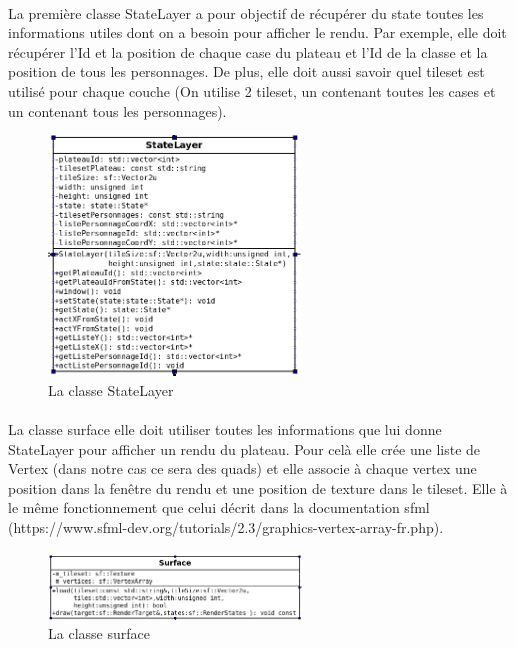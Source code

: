 \documentclass[a4paper,12pt]{article}
\begin{document}
\paragraph{}La première classe StateLayer a pour objectif de récupérer du state toutes les informations utiles dont on a besoin pour afficher le rendu. Par exemple, elle doit récupérer l'Id et la position de chaque case du plateau et l'Id de la classe et la position de tous les personnages. De plus, elle doit aussi savoir quel tileset est utilisé pour chaque couche (On utilise 2 tileset, un contenant toutes les cases et un contenant tous les personnages).
\begin{figure}[ht]
\begin{center}
\includegraphics[width=0.6\textwidth]{statelayer.png}
\caption{\label{pacmangame}La classe StateLayer}
\end{center}
\end{figure}

\paragraph{} La classe surface elle doit utiliser toutes les informations que lui donne StateLayer pour afficher un rendu du plateau. Pour celà elle crée une liste de Vertex (dans notre cas ce sera des quads) et elle associe à chaque vertex une position dans la fenêtre du rendu et une position de texture dans le tileset. Elle à le même fonctionnement que celui décrit dans la documentation sfml (https://www.sfml-dev.org/tutorials/2.3/graphics-vertex-array-fr.php).
\begin{figure}[ht]
\begin{center}
\includegraphics[width=0.6\textwidth]{surface.png}
\caption{\label{pacmangame}La classe surface}
\end{center}
\end{figure}
\newpage
\end{document}
